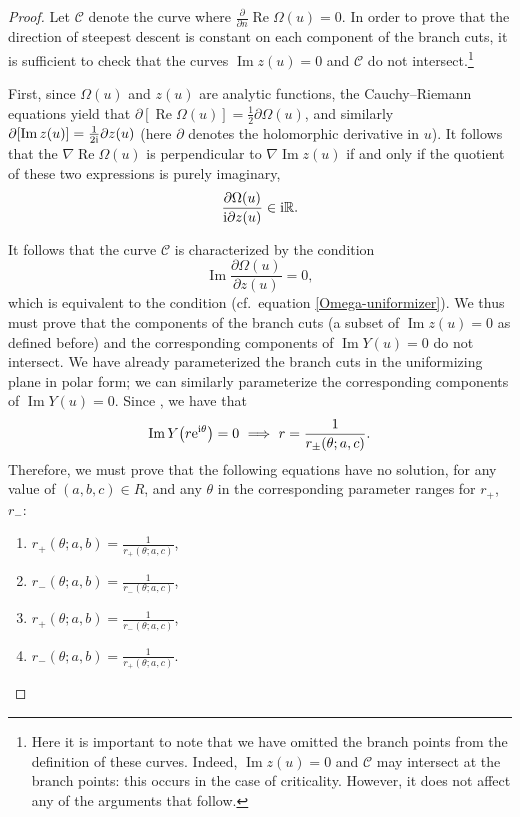 \documentclass[10pt,a4paper]{amsart}
\numberwithin{equation}{section}
\begin{document}
\begin{proof}
Let $\mathcal{C}$ denote the curve where $\frac{\partial}{\partial n} \operatorname{Re}\Omega(u) = 0$. In order to prove that the direction of steepest descent is constant on each component of the branch cuts, it is sufficient to check that the curves $\operatorname{Im} z(u) = 0$ and $\mathcal{C}$ do not intersect.\footnote{Here it is important to note that we have omitted the branch points from the definition of these curves. Indeed, $\operatorname{Im} z(u) = 0$ and $\mathcal{C}$ may intersect at the branch points: this occurs in the case of criticality. However, it does not affect any of the arguments that follow.}

First, since $\Omega(u)$ and $z(u)$ are analytic functions, the Cauchy--Riemann equations yield that $\partial[ \operatorname{Re}\Omega(u)] = \frac{1}{2}\partial \Omega(u)$,
and similarly $\partial [\operatorname{Im} z(u)] = \frac{1}{2{\rm i}}\partial z(u)$ (here $\partial$ denotes the holomorphic derivative in $u$). It follows that the $\nabla \operatorname{Re}\Omega(u)$ is perpendicular to $\nabla \operatorname{Im} z(u)$
if and only if the quotient of these two expressions is purely imaginary,
 \begin{equation*}
 \frac{\partial \Omega(u)}{{\rm i} \partial z(u)} \in {\rm i}\mathbb{R}.
 \end{equation*}

It follows that the curve $\mathcal{C}$ is characterized by the condition
 \begin{equation*}
 \operatorname{Im}\frac{\partial \Omega(u)}{\partial z(u)} = 0,
 \end{equation*}
which is equivalent to the condition  (cf.\ equation \eqref{Omega-uniformizer}).
We thus must prove that the components of the branch cuts (a subset of $\operatorname{Im} z(u) = 0$ as defined before) and the corresponding components of
$\operatorname{Im} Y(u) =0$ do not intersect.
We have already parameterized the branch cuts in the uniformizing plane in polar form; we can similarly parameterize the corresponding components of $\operatorname{Im}Y (u) = 0$. Since , we have that
 \begin{equation*}
 \operatorname{Im} Y\bigl(r{\rm e}^{{\rm i}\theta}\bigr) = 0 \ \Longrightarrow \ r = \frac{1}{r_{\pm}(\theta;a,c)}.
 \end{equation*}
Therefore, we must prove that the following equations have no solution, for any value of ${(a,b,c) \in R}$, and any $\theta$ in the corresponding parameter ranges
for $r_+$, $r_-$:
 \begin{enumerate}\itemsep=0pt
 \item[$(1)$] $r_{+}(\theta;a,b) = \frac{1}{r_{+}(\theta;a,c)}$,
 \item[$(2)$] $r_{-}(\theta;a,b) = \frac{1}{r_{-}(\theta;a,c)}$,
 \item[$(3)$] $r_{+}(\theta;a,b) = \frac{1}{r_{-}(\theta;a,c)}$,
 \item[$(4)$] $r_{-}(\theta;a,b) = \frac{1}{r_{+}(\theta;a,c)}$.
 \end{enumerate}


\end{proof}
\end{document}
